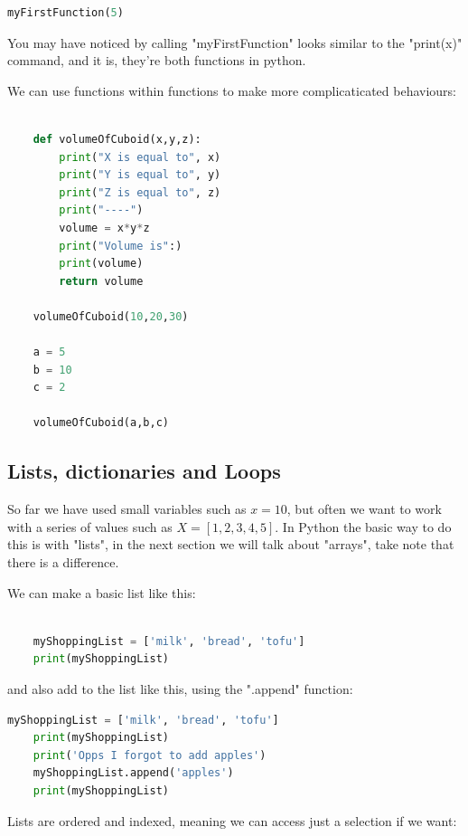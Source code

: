 \documentclass[12pt]{article}
\begin{document}
\begin{lstlisting}[language=Python]
myFirstFunction(5)
\end{lstlisting}

You may have noticed by calling "myFirstFunction" looks similar to the "print(x)" command, and it is, they're both functions in python. 

We can use functions within functions to make more complicaticated behaviours: 

\begin{lstlisting}[language=Python]

    def volumeOfCuboid(x,y,z):
        print("X is equal to", x)
        print("Y is equal to", y)
        print("Z is equal to", z)
        print("----")
        volume = x*y*z
        print("Volume is":)
        print(volume)
        return volume

    volumeOfCuboid(10,20,30)
    
    a = 5
    b = 10
    c = 2

    volumeOfCuboid(a,b,c)
\end{lstlisting}
    
\subsection{Lists, dictionaries and Loops}

So far we have used small variables such as $x=10$, but often we want to work with a series of values such as $X = [1,2,3,4,5]$. In Python the basic way to do this is with "lists", in the next section we will talk about "arrays", take note that there is a difference. 

We can make a basic list like this:

\begin{lstlisting}[language=Python]

    myShoppingList = ['milk', 'bread', 'tofu']
    print(myShoppingList)
\end{lstlisting}

and also add to the list like this, using the ".append" function:

\begin{lstlisting}[language=Python]
    myShoppingList = ['milk', 'bread', 'tofu']
    print(myShoppingList)
    print('Opps I forgot to add apples')
    myShoppingList.append('apples')
    print(myShoppingList)
\end{lstlisting}

Lists are ordered and indexed, meaning we can access just a selection if we want:
\end{document}

